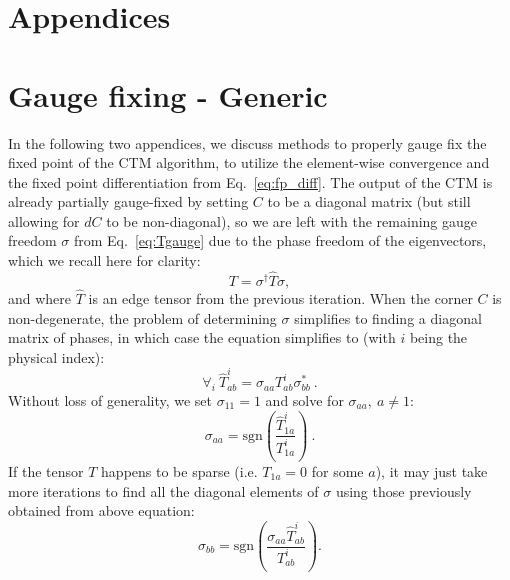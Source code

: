 \documentclass[twocolumn,floatfix,superscriptaddress,longbibliography,pra]{revtex4-2}
\let\oldsection=\section
\renewcommand{\section}[1]{\emph{#1.---}}
\begin{document}
\let\section=\oldsection

\clearpage
\section*{Appendices}
\appendix



\section{Gauge fixing -  Generic} 
\label{app:gauge_fixing}

In the following two appendices, we discuss methods to properly gauge fix the fixed point of the CTM algorithm, to utilize the element-wise convergence and the fixed point differentiation from Eq.~\eqref{eq:fp_diff}. The output of the CTM is already partially gauge-fixed by setting $C$ to be a diagonal matrix (but still allowing for $dC$ to be non-diagonal), so we are left with the remaining gauge freedom $\sigma$ from Eq.~\eqref{eq:Tgauge} due to the phase freedom of the eigenvectors, which we recall here for clarity:
\begin{equation}
    T = \sigma^\dagger\hat{T}\sigma,
\end{equation}
and where $\hat{T}$ is an edge tensor from the previous iteration. When the corner $C$ is non-degenerate, the problem of determining $\sigma$ simplifies to finding a diagonal matrix of phases, in which case the equation simplifies to (with $i$ being the physical index):
\begin{equation}
\forall_i ~ \hat{T}^i_{ab} = \sigma_{aa} T^i_{ab} \sigma^*_{bb}\ .
\end{equation}
Without loss of generality, we set $\sigma_{11} = 1$ and solve for $\sigma_{aa},~ a\neq 1$:
\begin{equation}
\sigma_{aa} = \text{sgn}\left(\frac{\hat{T}^i_{1a}}{T^i_{1a}}\right)\ .
\end{equation}
If the tensor $T$ happens to be sparse (i.e. $T_{1a} = 0$ for some $a$), it may just take more iterations to find all the diagonal elements of $\sigma$ using those previously obtained from above equation:
\begin{equation}
\sigma_{bb} = \text{sgn}\left(\frac{\sigma_{aa}\hat{T}^i_{ab}}{T^i_{ab}}\right).
\end{equation}
\end{document}
